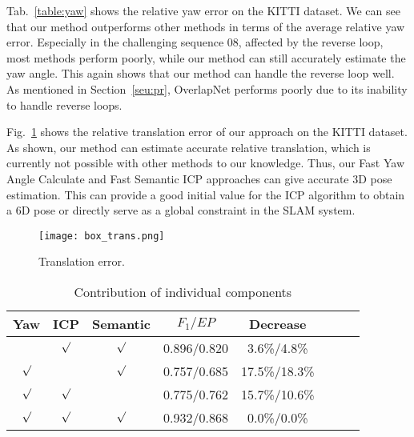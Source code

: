 \documentclass[letterpaper, 10 pt, conference]{ieeeconf}
\begin{document}
Tab.~\ref{table:yaw} shows the relative yaw error on the KITTI dataset. We can see that our method outperforms other methods in terms of the average relative yaw error. Especially in the challenging sequence 08, affected by the reverse loop, most methods perform poorly, while our method can still accurately estimate the yaw angle. This again shows that our method can handle the reverse loop well. As mentioned in Section~\ref{seu:pr}, OverlapNet performs poorly due to its inability to handle reverse loops.

Fig.~\ref{pic:trans} shows the relative translation error of our approach on the KITTI dataset. As shown, our method can estimate accurate relative translation, which is currently not possible with other methods to our knowledge. Thus, our Fast Yaw Angle Calculate and Fast Semantic ICP approaches can give accurate 3D pose estimation. This can provide a good initial value for the ICP algorithm to obtain a 6D pose or directly serve as a global constraint in the SLAM system. 








    \begin{figure}[t]
        \centering
\texttt{[image: box\_trans.png]}
\caption{Translation error.}
        \label{pic:trans}
     \end{figure}
     
\begin{table}[t]\footnotesize
    \caption{\centering Contribution of individual components}\vspace{-3mm}
    \label{table:Ablation}
    \begin{center}
\begin{tabular}{c c c c c c c c}
    \hline
    Yaw & ICP & Semantic & \(F_1/EP\)&Decrease\\ 
    \hline
    ~&$\surd$&$\surd$&0.896/0.820&3.6\%/4.8\%\\
    $\surd$&~&$\surd$&0.757/0.685&17.5\%/18.3\%\\
    $\surd$&$\surd$&~&0.775/0.762&15.7\%/10.6\%\\
    $\surd$&$\surd$&$\surd$&0.932/0.868&0.0\%/0.0\%\\
    \hline
    \end{tabular}
\end{center}
    \end{table}
\end{document}
